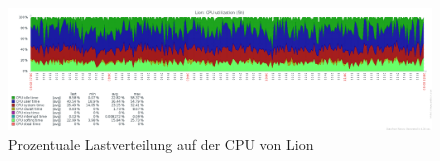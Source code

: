 \begin{figure}[htbp]
\centering
\includegraphics*[width=0.9\linewidth, angle=90]{Abb/ZabbixLion/Standard/CPUStandard20}

\caption{Prozentuale Lastverteilung auf der CPU von Lion}
\label{fig:CPULionStandard}
\end{figure}




